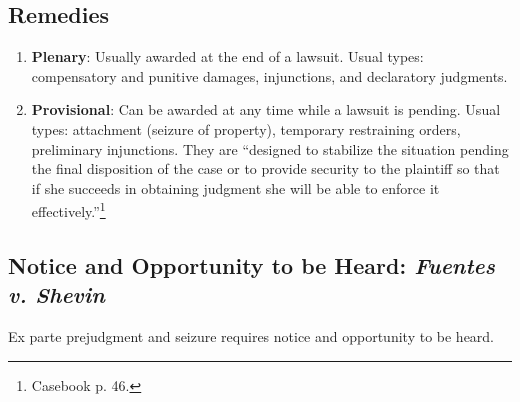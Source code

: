 \subsection{Remedies}

\begin{enumerate}
    \item \textbf{Plenary}: Usually awarded at the end of a lawsuit. Usual 
    types: compensatory and punitive damages, injunctions, and declaratory 
    judgments.
    \item \textbf{Provisional}: Can be awarded at any time while a lawsuit is 
    pending. Usual types: attachment (seizure of property), temporary 
    restraining orders, preliminary injunctions. They are ``designed to 
    stabilize the situation pending the final disposition of the case or to 
    provide security to the plaintiff so that if she succeeds in obtaining 
    judgment she will be able to enforce it effectively.''\footnote{Casebook 
    p. 46.}
\end{enumerate}

\subsection{Notice and Opportunity to be Heard: \emph{Fuentes v. Shevin}}

Ex parte prejudgment and seizure requires notice and opportunity to be heard.

